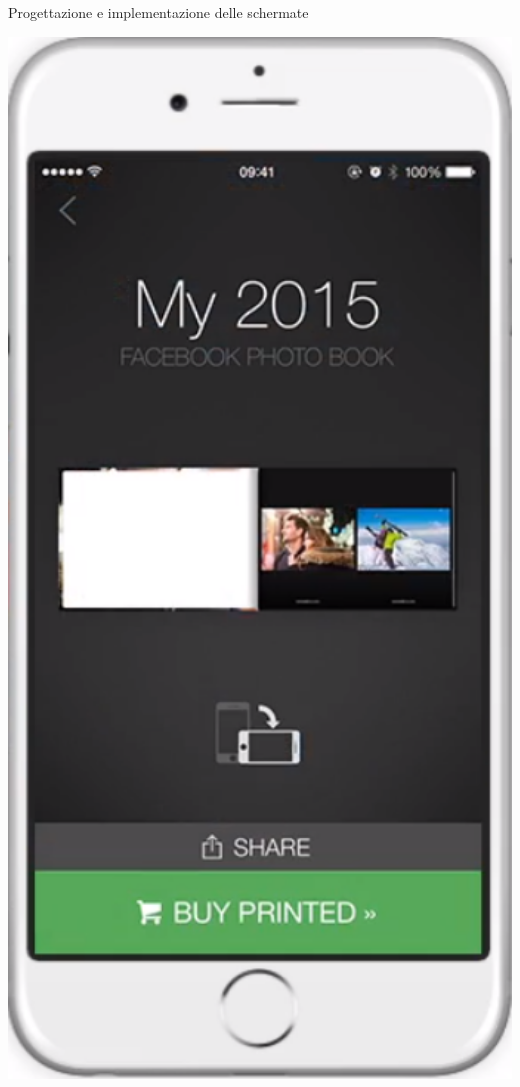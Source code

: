 \begin{frame}{Progettazione e implementazione delle schermate}
\begin{minipage}{0.49\textwidth}
\begin{minipage}{0.32\textwidth}
				\end{minipage}
				\begin{minipage}{0.32\textwidth}
					\includegraphics[width=1.0\textwidth]{capitolo_3/immagini/schermata_di_visualizzazione.png}

\end{minipage}
\end{minipage}
\end{frame}
